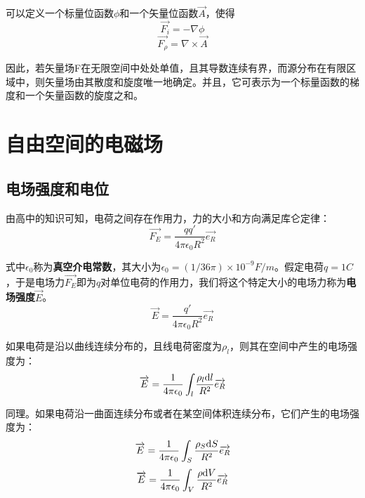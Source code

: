 \documentclass[UTF8,a4paper,11pt]{article}
\begin{document}
可以定义一个标量位函数$\phi$和一个矢量位函数$\overrightarrow{A}$，使得
\begin{equation}
\overrightarrow{F_i}=-\nabla\phi
\end{equation}
\begin{equation}
\overrightarrow{F_{\rho}}=\nabla\times\overrightarrow{A}
\end{equation}

因此，若矢量场F在无限空间中处处单值，且其导数连续有界，而源分布在有限区域中，则矢量场由其散度和旋度唯一地确定。并且，它可表示为一个标量函数的梯度和一个矢量函数的旋度之和。

\section{自由空间的电磁场}
\subsection{电场强度和电位}
由高中的知识可知，电荷之间存在作用力，力的大小和方向满足库仑定律：
\begin{equation}
\overrightarrow{F_E}=\frac{qq'}{4\pi\epsilon_0R^2}\overrightarrow{e_R}
\end{equation}

式中$\epsilon_0$称为\textbf{真空介电常数}，其大小为$\epsilon_0=(1/36\pi)\times10^{-9}F/m$。假定电荷$q=1C$，于是电场力$\overrightarrow{F_E}$即为$q$对单位电荷的作用力，我们将这个特定大小的电场力称为\textbf{电场强度}$\overrightarrow{E}$。
\begin{equation}
\overrightarrow{E}=\frac{q'}{4\pi\epsilon_0R^2}\overrightarrow{e_R}
\end{equation}

如果电荷是沿以曲线连续分布的，且线电荷密度为$\rho_l$，则其在空间中产生的电场强度为：
\begin{equation}
\overrightarrow{E}=\frac{1}{4\pi\epsilon_0}\int_l{\frac{\rho_l{\rm d}l}{R^2}\overrightarrow{e_R}}
\end{equation}

同理。如果电荷沿一曲面连续分布或者在某空间体积连续分布，它们产生的电场强度为：
\begin{equation}
\overrightarrow{E}=\frac{1}{4\pi\epsilon_0}\int_S{\frac{\rho_S{\rm d}S}{R^2}\overrightarrow{e_R}}
\end{equation}
\begin{equation}
\overrightarrow{E}=\frac{1}{4\pi\epsilon_0}\int_V{\frac{\rho{\rm d}V}{R^2}\overrightarrow{e_R}}
\end{equation}
\end{document}
